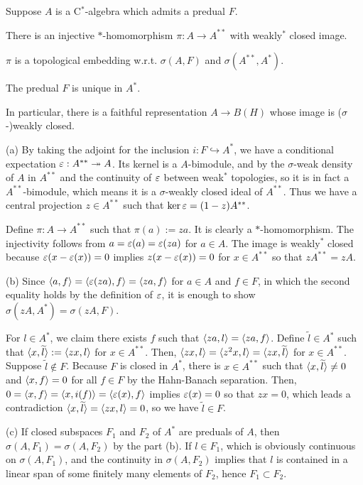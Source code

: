 \documentclass{../../../small}
\begin{document}
\begin{thm}[Sakai]
Suppose $A$ is a C$^*$-algebra which admits a predual $F$.
\begin{parts}
\item There is an injective $*$-homomorphism $\pi:A\to A^{**}$ with weakly$^*$ closed image.
\item $\pi$ is a topological embedding w.r.t. $\sigma(A,F)$ and $\sigma(A^{**}, A^*)$.
\item The predual $F$ is unique in $A^*$.
\end{parts}
In particular, there is a faithful representation $A\to B(H)$ whose image is ($\sigma$-)weakly closed.
\end{thm}
\begin{pf}
(a)
By taking the adjoint for the inclusion $i:F\hookrightarrow A^*$, we have a conditional expectation $\varepsilon:A^{**}\twoheadrightarrow A$.
Its kernel is a $A$-bimodule, and by the $\sigma$-weak density of $A$ in $A^{**}$ and the continuity of $\varepsilon$ between weak$^*$ topologies, so it is in fact a $A^{**}$-bimodule, which means it is a $\sigma$-weakly closed ideal of $A^{**}$.
Thus we have a central projection $z\in A^{**}$ such that $\ker\varepsilon=(1-z) A^{**}$.

Define $\pi:A\to A^{**}$ such that $\pi(a):=za$.
It is clearly a $*$-homomorphism.
The injectivity follows from $a=\varepsilon(a)=\varepsilon(za)$ for $a\in A$.
The image is weakly$^*$ closed because $\varepsilon(x-\varepsilon(x))=0$ implies $z(x-\varepsilon(x))=0$ for $x\in A^{**}$ so that $z A^{**}=z A$.

(b)
Since $\langle a,f\rangle=\langle\varepsilon(za),f\rangle=\langle za,f\rangle$ for $a\in A$ and $f\in F$, in which the second equality holds by the definition of $\varepsilon$, it is enough to show $\sigma(z A, A^*)=\sigma(z A,F)$.

For $l\in A^*$, we claim there exists $f$ such that $\langle za,l\rangle=\langle za,f\rangle$.
Define $\tilde l\in A^*$ such that $\langle x,\widetilde l\rangle:=\langle zx,l\rangle$ for $x\in A^{**}$.
Then, $\langle zx,l\rangle=\langle z^2x,l\rangle=\langle zx,\widetilde l\rangle$ for $x\in A^{**}$.
Suppose $\tilde l\notin F$.
Because $F$ is closed in $A^*$, there is $x\in A^{**}$ such that $\langle x,\widetilde l\rangle\ne0$ and $\langle x,f\rangle=0$ for all $f\in F$ by the Hahn-Banach separation.
Then, $0=\langle x,f\rangle=\langle x,i(f)\rangle=\langle\varepsilon(x),f\rangle$ implies $\varepsilon(x)=0$ so that $zx=0$, which leads a contradiction $\langle x,\widetilde l\rangle=\langle zx,l\rangle=0$, so we have $\tilde l\in F$.

(c)
If closed subspaces $F_1$ and $F_2$ of $A^*$ are preduals of $A$, then $\sigma(A,F_1)=\sigma(A,F_2)$ by the part (b).
If $l\in F_1$, which is obviously continuous on $\sigma(A,F_1)$, and the continuity in $\sigma(A,F_2)$ implies that $l$ is contained in a linear span of some finitely many elements of $F_2$, hence $F_1\subset F_2$.
\end{pf}
\end{document}
